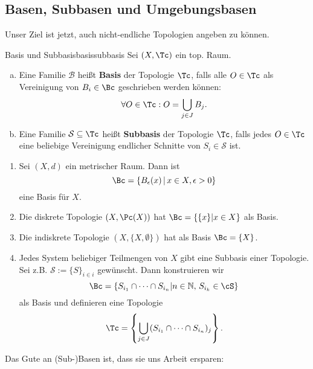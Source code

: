 \subsection{Basen, Subbasen und Umgebungsbasen}
\label{subsec:basen}
Unser Ziel ist jetzt, auch nicht-endliche Topologien angeben zu können.
\begin{definition}{Basis und Subbasis}{basissubbasis}
Sei $(X, \Tc)$ ein top. Raum.
\begin{enumerate}[(a)]
\item Eine Familie $\mathcal{B}$ heißt \textbf{Basis} der Topologie $\Tc$, falls alle $O \in \Tc$ als Vereinigung von $B_i \in \Bc$ geschrieben werden können:
\begin{equation}
\forall O \in \Tc: O = \bigcup_{j \in J} B_j. 
\end{equation}
\item Eine Familie $\mathcal{S} \sub \Tc$ heißt \textbf{Subbasis} der Topologie $\Tc$, falls jedes $O \in \Tc$ eine beliebige Vereinigung endlicher Schnitte von $S_i \in \mathcal{S}$ ist.
\end{enumerate}
\end{definition}
\begin{beispiele}
\begin{enumerate}
\item Sei $(X,d)$ ein metrischer Raum. Dann ist 
\begin{equation}
\Bc = \{B_\epsilon(x) \, | \, x \in X, \epsilon > 0\}
\end{equation}
eine Basis für $X$.
\item Die diskrete Topologie $(X, \Pc(X))$ hat $\Bc = \{ \{x\} | x \in X\}$ als Basis. 
\item Die indiskrete Topologie $(X, \{X, \emptyset \})$ hat als Basis $\Bc = \{X\}$.
\item Jedes System beliebiger Teilmengen von $X$ gibt eine Subbasis einer Topologie. Sei z.B. $\mathcal{S} := \{S\}_{i\in i}$ gewünscht. Dann konstruieren wir 
\begin{equation}
\Bc = \{S_{i_1} \cap \dots \cap S_{i_n} |n \in \N, \, S_{i_k} \in \cS\}
\end{equation} 
als Basis und definieren eine Topologie
\begin{equation}
\Tc = \left\{ \bigcup_{j \in J} (S_{i_1} \cap \cdots \cap S_{i_n})_j \right\}.
\end{equation}
\end{enumerate}
\end{beispiele}
Das Gute an (Sub-)Basen ist, dass sie uns Arbeit ersparen:
